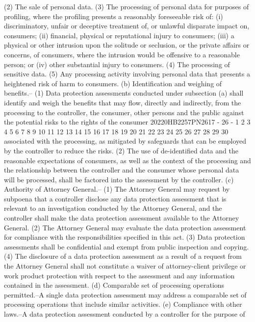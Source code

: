(2) The sale of personal data.
(3) The processing of personal data for purposes of
profiling, where the profiling presents a reasonably
foreseeable risk of:
(i) discriminatory, unfair or deceptive treatment
of, or unlawful disparate impact on, consumers;
(ii) financial, physical or reputational injury to
consumers;
(iii) a physical or other intrusion upon the
solitude or seclusion, or the private affairs or
concerns, of consumers, where the intrusion would be
offensive to a reasonable person; or
(iv) other substantial injury to consumers.
(4) The processing of sensitive data.
(5) Any processing activity involving personal data that
presents a heightened risk of harm to consumers.
(b) Identification and weighing of benefits.--
(1) Data protection assessments conducted under
subsection (a) shall identify and weigh the benefits that may
flow, directly and indirectly, from the processing to the
controller, the consumer, other persons and the public
against the potential risks to the rights of the consumer
20220HB2257PN2617 - 26 -
1
2
3
4
5
6
7
8
9
10
11
12
13
14
15
16
17
18
19
20
21
22
23
24
25
26
27
28
29
30
associated with the processing, as mitigated by safeguards
that can be employed by the controller to reduce the risks.
(2) The use of de-identified data and the reasonable
expectations of consumers, as well as the context of the
processing and the relationship between the controller and
the consumer whose personal data will be processed, shall be
factored into the assessment by the controller.
(c) Authority of Attorney General.--
(1) The Attorney General may request by subpoena that a
controller disclose any data protection assessment that is
relevant to an investigation conducted by the Attorney
General, and the controller shall make the data protection
assessment available to the Attorney General.
(2) The Attorney General may evaluate the data
protection assessment for compliance with the
responsibilities specified in this act.
(3) Data protection assessments shall be confidential
and exempt from public inspection and copying.
(4) The disclosure of a data protection assessment as a
result of a request from the Attorney General shall not
constitute a waiver of attorney-client privilege or work
product protection with respect to the assessment and any
information contained in the assessment.
(d) Comparable set of processing operations permitted.--A
single data protection assessment may address a comparable set
of processing operations that include similar activities.
(e) Compliance with other laws.--A data protection
assessment conducted by a controller for the purpose of

